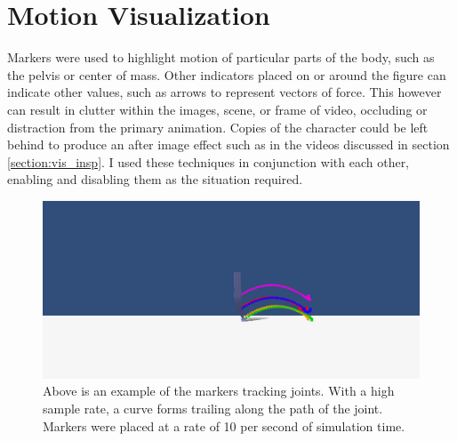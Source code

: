 \section{Motion Visualization}
\label{section:motion_vis}

Markers were used to highlight motion of particular parts of the body, such as the pelvis or center of mass.  Other indicators placed on or around the figure can indicate other values, such as arrows to represent vectors of force.  This however can result in clutter within the images, scene, or frame of video, occluding or distraction from the primary animation.  Copies of the character could be left behind to produce an after image effect such as in the videos discussed in section \ref{section:vis_insp}.  I used these techniques in conjunction with each other, enabling and disabling them as the situation required.


\begin{figure}[ht]
	\centering
	\includegraphics[width=\textwidth]{images/trails/trail-side.png}
	\caption[Marker trail visualization of motion]{Above is an example of the markers tracking joints.  With a high sample rate, a curve forms trailing along the path of the joint.  Markers were placed at a rate of 10 per second of simulation time.}
	\label{fig:marker_trails}
\end{figure}

